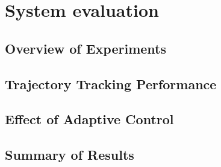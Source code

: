 \chapter{System evaluation}
\label{chapter:results}

\section{Overview of Experiments}
\label{section:experiment_overview}

\section{Trajectory Tracking Performance}
\label{section:trajectory_performance}

\section{Effect of Adaptive Control}
\label{section:adaptive_pso_results}

\section{Summary of Results}
\label{section:results_summary}
